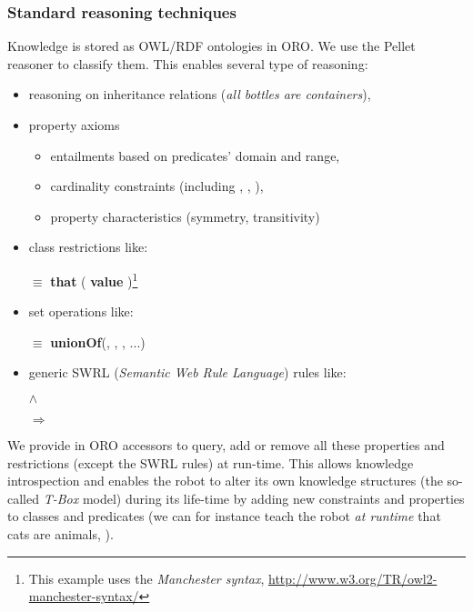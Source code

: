\subsubsection{Standard reasoning techniques}


Knowledge is stored as OWL/RDF ontologies in ORO. We use the Pellet reasoner to
classify them. This enables several type of reasoning:

\begin{itemize}
	\item reasoning on inheritance relations (\eg \emph{all bottles are containers}),
	\item property axioms
		\begin{itemize}
		\item entailments based on predicates' domain and range,
		\item cardinality constraints (including , 
		, ),
		\item property characteristics (symmetry, transitivity)
		\end{itemize}
	\item class restrictions like: \par \footnotesize {} $\equiv$
		 {\bf that} ( {\bf value}
		)\footnote{This example uses the \emph{Manchester
		syntax}, \url{http://www.w3.org/TR/owl2-manchester-syntax/}} \normalsize
	\item set operations like: \par \footnotesize {} $\equiv$ {\bf unionOf}(,
		, , ...) \normalsize
	\item generic SWRL ({\em Semantic Web Rule Language}) rules like: \par
		\footnotesize {} $\land$
		 \par $\Rightarrow$ 
		\normalsize 
	\end{itemize}

We provide in ORO accessors to query, add or remove all these properties and
restrictions (except the SWRL rules) at run-time. This allows knowledge
introspection and enables the robot to alter its own knowledge structures (the
so-called \emph{T-Box} model) during its life-time by adding new constraints
and properties to classes and predicates (we can for instance teach the robot
\emph{at runtime} that cats are animals, \ie {}).



